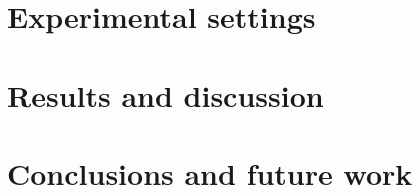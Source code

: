\documentclass[10pt, a4paper]{article}
\begin{document}
\section{Experimental settings}
\label{sec:exper-sett}


\section{Results and discussion}
\label{sec:results-discussion}


\section{Conclusions and future work}
\label{sec:concl-future-work}




\end{document}
